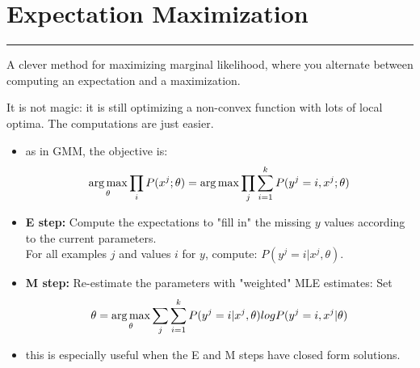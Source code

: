 \section{Expectation Maximization}
\smallskip \hrule height 2pt \smallskip

A clever method for maximizing marginal likelihood, where you alternate between computing an expectation and a maximization. 

It is not magic: it is still optimizing a non-convex function with lots of local optima.  The computations are just easier. 

\begin{itemize}
	\item as in GMM, the objective is: 
		$$ \operatorname*{arg\,max}_{\theta} \prod_i P(x^j; \theta) = \operatorname*{arg\,max} \prod_j \sum_{i=1}^k P(y^j=i, x^j; \theta) $$
	\item \textbf{E step:} Compute the expectations to "fill in" the missing $y$ values according to the current parameters. \hfill \\
		For all examples $j$ and values $i$ for $y$, compute: $P(y^j = i | x^j, \theta)$. 
	\item \textbf{M step:}
		Re-estimate the parameters with "weighted" MLE estimates:
		Set 
			$$\theta = \operatorname*{arg\,max}_{\theta} \sum_j \sum_{i=1}^k P(y^j = i | x^j, \theta) log P(y^j = i, x^j | \theta )$$ 
	\item this is especially useful when the E and M steps have closed form solutions. 
\end{itemize}